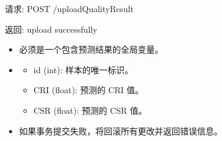 \documentclass[a4paper,12pt,english]{sphinxmanual}
\begin{document}
\begin{fulllineitems}
\begin{description}
\begin{sphinxVerbatim}[commandchars=\\\{\}]
请求:
POST /uploadQualityResult

返回:
\PYGZdq{}upload successfully\PYGZdq{}
\end{sphinxVerbatim}

\begin{itemize}
\item {} 
\sphinxAtStartPar
{} 必须是一个包含预测结果的全局变量。

\item {} \begin{description}
\begin{itemize}
\item {} 
\sphinxAtStartPar
id (int): 样本的唯一标识。

\item {} 
\sphinxAtStartPar
CRI (float): 预测的 CRI 值。

\item {} 
\sphinxAtStartPar
CSR (float): 预测的 CSR 值。

\end{itemize}

\end{description}

\item {} 
\sphinxAtStartPar
如果事务提交失败，将回滚所有更改并返回错误信息。

\end{itemize}

\end{description}

\end{fulllineitems}

\end{document}
